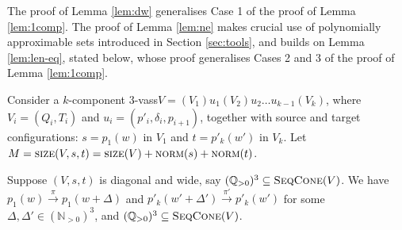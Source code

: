 \documentclass[a4paper, UKenglish, cleveref, autoref, thm-restate]{lipics-v2021}
\newcommand{\sandwich}{polynomially approximable\xspace}
\newcommand{\N}{\mathbb{N}}
\newcommand{\Q}{\mathbb{Q}}
\newcommand{\Qpos}{\Q_{>0}}
\newcommand{\trans}[1]{\stackrel{#1}{\longrightarrow}}
\newcommand{\norm}{\textsc{norm}}
\newcommand{\size}{\textsc{size}}
\newcommand{\vass}{{\sc vass}\xspace}
\newcommand{\tvass}{\parvass 3}
\newcommand{\parvass}[1]{{$#1$-\vass}\xspace}
\newcommand{\ktvass}{(V_1) u_1 (V_2) u_2 \ldots u_{k-1} (V_k)}
\newcommand{\seqcone}[1]{\textsc{SeqCone}(#1)}
\newcommand{\Npos}{\N_{>0}}
\begin{document}
The proof of Lemma \ref{lem:dw} generalises Case 1 of the proof of Lemma \ref{lem:1comp}.
The proof of Lemma \ref{lem:ne} makes crucial use of \sandwich sets introduced
in Section \ref{sec:tools}, and builds on 
Lemma \ref{lem:len-eq}, stated below, whose proof 
generalises Cases 2 and 3 of the proof of Lemma \ref{lem:1comp}.


\begin{appendixproof}
Consider a $k$-component \tvass  $V = \ktvass$,
where $V_i = (Q_i, T_i)$ and $u_i = (p'_i, \delta_i, p_{i+1})$,
together with source and target configurations: 
$s=p_1(w)$ in $V_1$ and $t=p'_k(w')$ in $V_k$.
Let $M = \size(V, s, t) = \size(V) + \norm(s) + \norm(t)$.

Suppose $(V, s, t)$ is diagonal and wide, say $(\Qpos)^3 \subseteq \seqcone{V}$.
We have
$p_1(w) \trans\pi p_1(w+\Delta)$ and
$p'_k(w'+\Delta')\trans{\pi'} p'_k(w')$  for some $\Delta,\Delta'\in(\Npos)^3$, and 
$(\Qpos)^3 \subseteq \seqcone V$.



\end{appendixproof}
\end{document}
